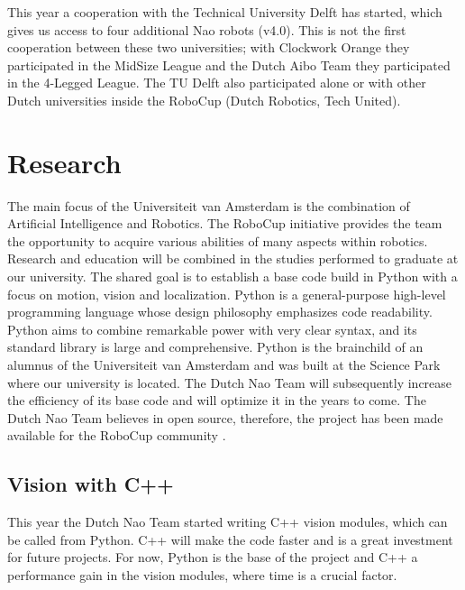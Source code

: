 \documentclass[11pt]{llncs}
\begin{document}
This year a cooperation with the Technical University Delft has started, which gives us access to four additional Nao robots (v4.0). This is not the first cooperation between these two universities; with Clockwork Orange they participated in the MidSize League and
the Dutch Aibo Team they participated in the 4-Legged League. The TU Delft also participated alone or with other Dutch universities inside the RoboCup (Dutch Robotics, Tech United).

\section{Research}
The main focus of the Universiteit van Amsterdam is the combination of Artificial Intelligence and Robotics. The RoboCup initiative provides the team the opportunity to acquire various abilities of many aspects within robotics.
Research and education will be combined in the studies performed to graduate at our university. The shared goal is to establish a base code build in Python with a focus on motion, vision and localization. 
Python is a general-purpose high-level programming language whose design philosophy emphasizes code readability. Python aims to combine remarkable power with very clear syntax, and its standard library is large and comprehensive. 
Python is the brainchild of an alumnus of the Universiteit van Amsterdam and was built at the Science Park where our university is located. 
The Dutch Nao Team will subsequently increase the efficiency of its base code and will optimize it in the years to come. 
The Dutch Nao Team believes in open source, therefore, the project has been made available for the RoboCup community \cite{DutchNaoTeamTechReport2011}.
\subsection{Vision with C++}
This year the Dutch Nao Team started writing C++ vision modules, which can be called from Python. C++ will make the code faster and is a great investment for future projects. For now, Python is the base of the project and C++ a performance gain in the vision modules, where time is a crucial factor.
\end{document}
